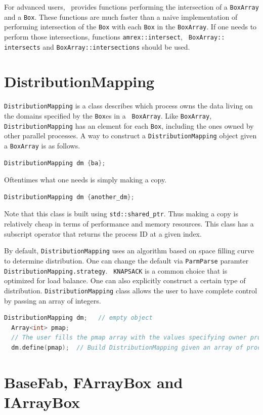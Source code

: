 {For advanced users, \amrex\ provides functions performing the
intersection of a {\tt BoxArray} and a {\tt Box}.  These functions are
much faster than a naive implementation of performing intersection of
the {\tt Box} with each {\tt Box} in the {\tt BoxArray}.  If one needs
to perform those intersections, functions {\tt amrex::intersect}, {\tt
  BoxArray:: intersects} and {\tt BoxArray::intersections} should be
used.

\section{DistributionMapping}
\label{sec:basics:dm}

{\tt DistributionMapping} is a class describes which process owns the
data living on the domains specified by the {\tt Box}es in a {\tt
  BoxArray}.  Like {\tt BoxArray}, {\tt DistributionMapping} has an
element for each {\tt Box}, including the ones owned by other parallel
processes.  A way to construct a {\tt DistributionMapping} object
given a {\tt BoxArray} is as follows.
\begin{lstlisting}[language=cpp]
  DistributionMapping dm {ba};
\end{lstlisting}
Oftentimes what one needs is simply making a copy. 
\begin{lstlisting}[language=cpp]
  DistributionMapping dm {another_dm};
\end{lstlisting}
Note that this class is built using {\tt std::shared\_ptr}.  Thus
making a copy is relatively cheap in terms of performance and memory
resources.  This class has a subscript operator that returns the
process ID at a given index.

By default, {\tt DistributionMapping} uses an algorithm based on space
filling curve to determine distribution.  One can change the default
via {\tt ParmParse} paramter {\tt DistributionMapping.strategy}.  {\tt
  KNAPSACK} is a common choice that is optimized for load balance.
One can also explicitly construct a certain type of distribution.
{\tt DistributionMapping} class allows the user to have complete control by
passing an array of integers. 
\begin{lstlisting}[language=cpp]
  DistributionMapping dm;   // empty object
  Array<int> pmap;
  // The user fills the pmap array with the values specifying owner processes
  dm.define(pmap);  // Build DistributionMapping given an array of process IDs.
\end{lstlisting}


\section{BaseFab, FArrayBox and IArrayBox}
\label{sec:basics:fab}

}
